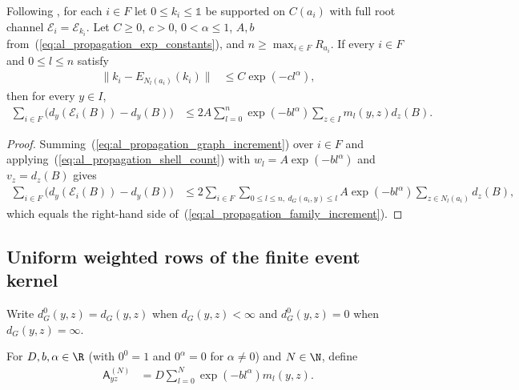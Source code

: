 \begin{lemma}
    \label{thm:al_graph_event_increment_cardinality}
    \leanok
    Following \cite[Section~10]{OpenAI2026AreaLaw}, for each $i\in F$ let
    $0\le k_i\le\mathbb 1$ be supported on $C(a_i)$ with full root channel
    $\mathcal E_i=\mathcal E_{k_i}$. Let $C\ge0$, $c>0$, $0<\alpha\le1$, $A,b$
    from~(\ref{eq:al_propagation_exp_constants}), and $n\ge\max_{i\in F}R_{a_i}$.
    If every $i\in F$ and $0\le l\le n$ satisfy
    \begin{align}
        \label{eq:al_propagation_family_error}
        \|k_i-E_{N_l(a_i)}(k_i)\| & \le C\exp(-cl^\alpha),
    \end{align}
    then for every $y\in I$,
    \begin{align}
        \label{eq:al_propagation_family_increment}
        \sum_{i\in F}\bigl(d_y(\mathcal E_i(B))-d_y(B)\bigr)
         & \le2A\sum_{l=0}^{n}\exp(-bl^\alpha)
        \sum_{z\in I}m_l(y,z)d_z(B).
    \end{align}
\end{lemma}
\begin{proof}
    \leanok
    Summing~(\ref{eq:al_propagation_graph_increment}) over $i\in F$ and
    applying~(\ref{eq:al_propagation_shell_count}) with
    $w_l=A\exp(-bl^\alpha)$ and $v_z=d_z(B)$ gives
    \begin{align}
        \label{eq:al_propagation_family_shells}
        \sum_{i\in F}\bigl(d_y(\mathcal E_i(B))-d_y(B)\bigr)
         & \le2\sum_{i\in F}\sum_{0\le l\le n,\ d_G(a_i,y)\le l}
        A\exp(-bl^\alpha)\sum_{z\in N_l(a_i)}d_z(B),
    \end{align}
    which equals the right-hand side
    of~(\ref{eq:al_propagation_family_increment}).
\end{proof}

\subsection{Uniform weighted rows of the finite event kernel}

Write $d_G^0(y,z)=d_G(y,z)$ when $d_G(y,z)<\infty$ and $d_G^0(y,z)=0$ when
$d_G(y,z)=\infty$.

\begin{definition}
    \label{def:al_graph_event_kernel}
    \leanok
    For $D,b,\alpha\in\R$ (with $0^0=1$ and $0^\alpha=0$ for $\alpha\ne0$) and
    $N\in\N$, define
    \begin{align}
        \label{eq:al_propagation_event_kernel}
        \mathsf A^{(N)}_{yz}
         & =D\sum_{l=0}^{N}\exp(-bl^\alpha)m_l(y,z).
    \end{align}
\end{definition}

